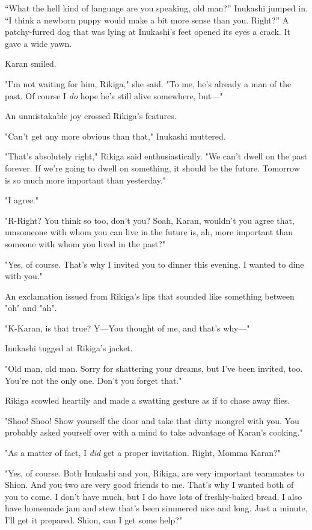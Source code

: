 ``What the hell kind of language are you speaking, old man?'' Inukashi
jumped in. ``I think a newborn puppy would make a bit more sense than
you. Right?'' A patchy-furred dog that was lying at Inukashi's feet
opened its eyes a crack. It gave a wide yawn.

Karan smiled.

"I'm not waiting for him, Rikiga," she said. "To me, he's already a man
of the past. Of course I \emph{do} hope he's still alive somewhere, but---"

An unmistakable joy crossed Rikiga's features.

"Can't get any more obvious than that," Inukashi muttered.

"That's absolutely right," Rikiga said enthusiastically. "We can't dwell
on the past forever. If we're going to dwell on something, it should be
the future. Tomorrow is so much more important than yesterday."

"I agree."

"R-Right? You think so too, don't you? So\el ah, Karan, wouldn't you
agree that, um\el someone with whom you can live in the future is, ah,
more important than someone with whom you lived in the past?"

"Yes, of course. That's why I invited you to dinner this evening. I
wanted to dine with you."

An exclamation issued from Rikiga's lips that sounded like something
between "oh" and "ah".

"K-Karan, is that true? Y---You thought of me, and that's why---"

Inukashi tugged at Rikiga's jacket.

"Old man, old man. Sorry for shattering your dreams, but I've been
invited, too. You're not the only one. Don't you forget that."

Rikiga scowled heartily and made a swatting gesture as if to chase away
flies.

"Shoo! Shoo! Show yourself the door and take that dirty mongrel with
you. You probably asked yourself over with a mind to take advantage of
Karan's cooking."

"As a matter of fact, I \emph{did} get a proper invitation. Right, Momma
Karan?"

"Yes, of course. Both Inukashi and you, Rikiga, are very important
teammates to Shion. And you two are very good friends to me. That's why
I wanted both of you to come. I don't have much, but I do have lots of
freshly-baked bread. I also have homemade jam and stew that's been
simmered nice and long. Just a minute, I'll get it prepared. Shion, can
I get some help?"

